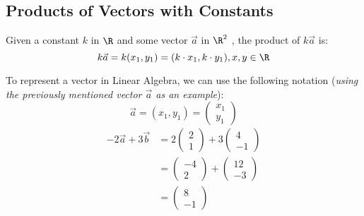 \documentclass[a4paper]{article}
\begin{document}
  \subsection{Products of Vectors with Constants}
  \begin{theorem}
    Given a constant $k$ in $\R$ and some vector $\vec{a}$ in $\R^2$ , the product of $k \vec{a}$ is:
    \begin{displaymath}
      k \vec{a} = k(x_1,y_1) = (k\cdot x_1, k\cdot y_1), x,y \in \R
    \end{displaymath}
  \end{theorem}
  To represent a vector in Linear Algebra, we can use the following notation (\textit{using the previously mentioned vector $\vec{a}$ as an example}):
  $$
  \vec{a} = (x_1,y_1) = 
  \begin{pmatrix}
   x_1 \\ y_1 
  \end{pmatrix}
  $$
  \begin{equation}
    \label{eq:1}
    \begin{split}
      -2\vec{a} + 3\vec{b} &= 2\begin{pmatrix}
       2 \\ 1 
      \end{pmatrix} + 3 \begin{pmatrix}
       4 \\ -1 
      \end{pmatrix}\\
                           &= \begin{pmatrix}
                           -4 \\ 2 
                           \end{pmatrix} + \begin{pmatrix}
                           12 \\ -3 
                           \end{pmatrix} \\
                           &= \begin{pmatrix}
                           8 \\ -1 
                           \end{pmatrix}
    \end{split}
  \end{equation}
\end{document}
